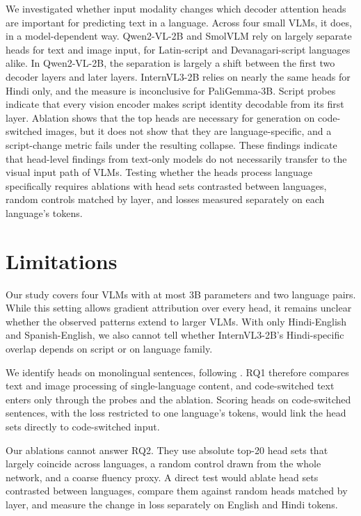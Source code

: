 \documentclass[10pt]{article}
\begin{document}
We investigated whether input modality changes which decoder attention heads are important for predicting text in a language. Across four small VLMs, it does, in a model-dependent way. Qwen2-VL-2B and SmolVLM rely on largely separate heads for text and image input, for Latin-script and Devanagari-script languages alike. In Qwen2-VL-2B, the separation is largely a shift between the first two decoder layers and later layers. InternVL3-2B relies on nearly the same heads for Hindi only, and the measure is inconclusive for PaliGemma-3B. Script probes indicate that every vision encoder makes script identity decodable from its first layer. Ablation shows that the top heads are necessary for generation on code-switched images, but it does not show that they are language-specific, and a script-change metric fails under the resulting collapse. These findings indicate that head-level findings from text-only models do not necessarily transfer to the visual input path of VLMs. Testing whether the heads process language specifically requires ablations with head sets contrasted between languages, random controls matched by layer, and losses measured separately on each language's tokens.

\section*{Limitations}

Our study covers four VLMs with at most 3B parameters and two language pairs. While this setting allows gradient attribution over every head, it remains unclear whether the observed patterns extend to larger VLMs. With only Hindi-English and Spanish-English, we also cannot tell whether InternVL3-2B's Hindi-specific overlap depends on script or on language family.

We identify heads on monolingual sentences, following \citet{liu2026lahis}. RQ1 therefore compares text and image processing of single-language content, and code-switched text enters only through the probes and the ablation. Scoring heads on code-switched sentences, with the loss restricted to one language's tokens, would link the head sets directly to code-switched input.

Our ablations cannot answer RQ2. They use absolute top-20 head sets that largely coincide across languages, a random control drawn from the whole network, and a coarse fluency proxy. A direct test would ablate head sets contrasted between languages, compare them against random heads matched by layer, and measure the change in loss separately on English and Hindi tokens.
\end{document}
